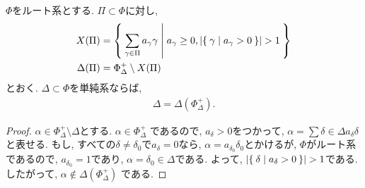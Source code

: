 \begin{lemma}
  \label{lem:simplesumissimplesystem:}
  $\Phi$をルート系とする.
  $\Pi\subset \Phi$に対し,
  \begin{align*}
    X(\Pi)&= \Set{\sum_{\gamma\in\Pi}a_\gamma\gamma| a_\gamma\geq 0, \numof{\Set{\gamma|a_\gamma>0}}>1}\\
    \Delta(\Pi)&= \Phi_{\Delta}^+ \setminus X(\Pi)
  \end{align*}
  とおく.
  $\Delta\subset \Phi$を単純系ならば,
  \begin{align*}
    \Delta=\Delta(\Phi_\Delta^+).
  \end{align*}
\end{lemma}
\begin{proof}
  $\alpha \in \Phi_\Delta^+\setminus\Delta$とする.
  $\alpha\in \Phi_\Delta^+$
  であるので,
  $a_\delta > 0$をつかって,
  $\alpha=\sum{\delta\in\Delta}a_\delta \delta$と表せる.
  もし, すべての$\delta\neq\delta_0$で$a_\delta=0$なら,
  $\alpha=a_{\delta_0} \delta_0$とかけるが,
  $\Phi$がルート系であるので, $a_{\delta_0}=1$であり,
  $\alpha=\delta_0\in\Delta$である.
  よって, $\numof{\Set{\delta|a_\delta>0}}>1$である.
  したがって, $\alpha\not\in \Delta(\Phi_\Delta^+)$
  である.



\end{proof}
